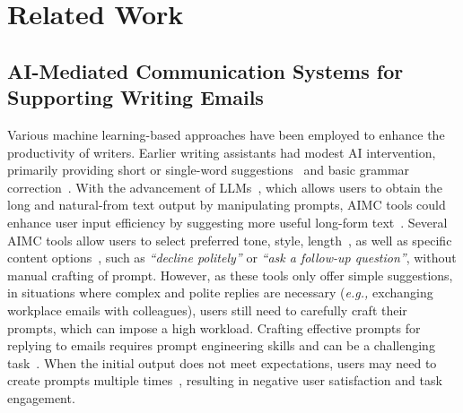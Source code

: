 \section{Related Work}

\subsection{AI-Mediated Communication Systems for Supporting Writing Emails}
Various machine learning-based approaches have been employed to enhance the productivity of writers.
Earlier writing assistants had modest AI intervention, primarily providing short or single-word suggestions~\cite{hohenstein2018AI-Supported, dunlop2012multidimensional, fowler2015effects, quinn2016cost} and basic grammar correction~\cite{Grammarly}.
With the advancement of LLMs~\cite{chang2024survey}, which allows users to obtain the long and natural-from text output by manipulating prompts, AIMC tools could enhance user input efficiency by suggesting more useful long-form text~\cite{Fu2023Comparing, dhillon2024shaping}.
Several AIMC tools allow users to select preferred tone, style, length~\cite{Grammarly, Foodman2022LaMPost, fu2024text, bastola2024llmbasedsmartreplylsr}, as well as specific content options~\cite{Grammarly, bastola2024llmbasedsmartreplylsr}, such as \textit{``decline politely''} or \textit{``ask a follow-up question''}, without manual crafting of prompt.
However, as these tools only offer simple suggestions, in situations where complex and polite replies are necessary (\textit{e.g.,} exchanging workplace emails with colleagues), users still need to carefully craft their prompts, which can impose a high workload.
Crafting effective prompts for replying to emails requires prompt engineering skills and can be a challenging task~\cite{Zhou2024GlassMail}.
When the initial output does not meet expectations, users may need to create prompts multiple times~\cite{fu2024text}, resulting in negative user satisfaction and task engagement.

